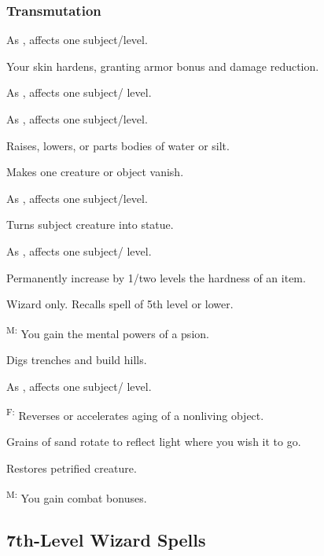 \subsubsection{Transmutation}

	 As , affects one subject/level.

	 Your skin hardens, granting armor bonus and damage reduction. %

	 As , affects one subject/ level.

	 As , affects one subject/level.

	 Raises, lowers, or parts bodies of water or silt. %

	 Makes one creature or object vanish.

	 As , affects one subject/level.

	 Turns subject creature into statue.

	 As , affects one subject/ level.

	 Permanently increase by 1/two levels the hardness of an item.

	 Wizard only. Recalls spell of 5th level or lower.

	\textsuperscript{M:} You gain the mental powers of a psion.

	 Digs trenches and build hills.

	 As , affects one subject/ level.

	\textsuperscript{F:} Reverses or accelerates aging of a nonliving object. %

	 Grains of sand rotate to reflect light where you wish it to go. %

	 Restores petrified creature.

	\textsuperscript{M:} You gain combat bonuses.



\subsection{7th-Level Wizard Spells}

